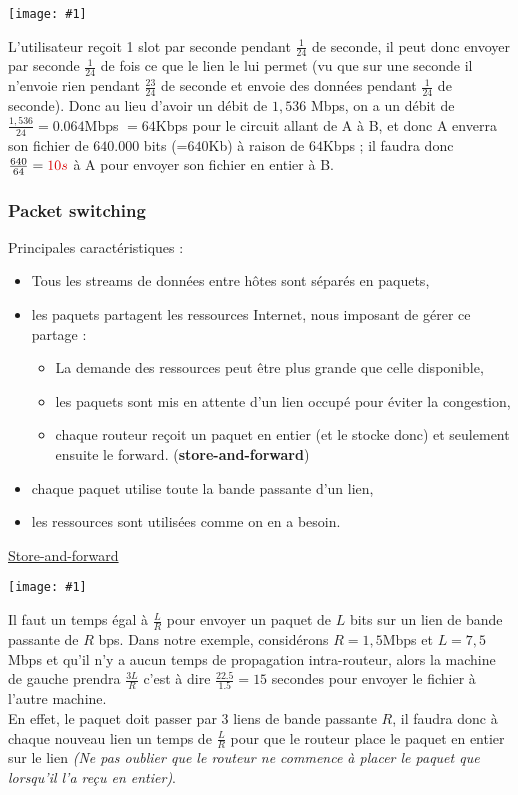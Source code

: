 \documentclass{article}
\newcommand{\red}[1]{\textcolor{darkred}{#1}}
\newcommand{\imgR}[2]{\begin{center}\texttt{[image: \#1]}\end{center}}
\begin{document}
\imgR{CN_004.png}{300}

\noindent L'utilisateur reçoit 1 slot par seconde pendant $\frac{1}{24}$ de seconde, il peut donc envoyer par 
seconde $\frac{1}{24}$ de fois ce que le lien le lui permet (vu que sur une seconde il n'envoie rien pendant 
$\frac{23}{24}$ de seconde et envoie des données pendant $\frac{1}{24}$ de seconde). Donc au lieu d'avoir un 
débit de $1,536$ Mbps, on a un débit de $\frac{1,536}{24} = 0.064$Mbps $=64$Kbps pour le circuit allant de A à 
B, et donc A enverra son fichier de $640.000$ bits (=$640$Kb) à raison de $64$Kbps ; il faudra donc $\frac{640}
{64} = \red{10s}$ à A pour envoyer son fichier en entier à B.

\subsubsection{Packet switching}

\noindent Principales caractéristiques :
\begin{itemize}
\item Tous les streams de données entre hôtes sont séparés en paquets,
\item les paquets partagent les ressources Internet, nous imposant de gérer ce partage : 
\begin{itemize}
\item La demande des ressources peut être plus grande que celle disponible,
\item les paquets sont mis en attente d'un lien occupé pour éviter la congestion,
\item chaque routeur reçoit un paquet en entier (et le stocke donc) et seulement ensuite le forward. 
(\textbf{store-and-forward})
\end{itemize}
\item chaque paquet utilise toute la bande passante d'un lien,
\item les ressources sont utilisées comme on en a besoin.
\end{itemize}

\noindent \underline{Store-and-forward} 
\imgR{CN_005.png}{300}

\noindent Il faut un temps égal à $\frac{L}{R}$ pour envoyer un paquet de $L$ bits sur un lien de bande passante 
de $R$ bps. Dans notre exemple, considérons $R = 1,5$Mbps et $L = 7,5$Mbps et qu'il n'y a aucun temps de
propagation intra-routeur, alors la machine de gauche prendra $\frac{3L}{R}$ c'est à dire $\frac{22.5}{1.5} = 15$ 
secondes pour envoyer le fichier à l'autre machine.\\
En effet, le paquet doit passer par 3 liens de bande passante $R$, il 
faudra donc à chaque nouveau lien un temps de $\frac{L}{R}$ pour que le routeur place le paquet en entier sur le 
lien \textit{(Ne pas oublier que le routeur ne commence à placer le paquet que lorsqu'il l'a reçu en entier)}.
\end{document}
